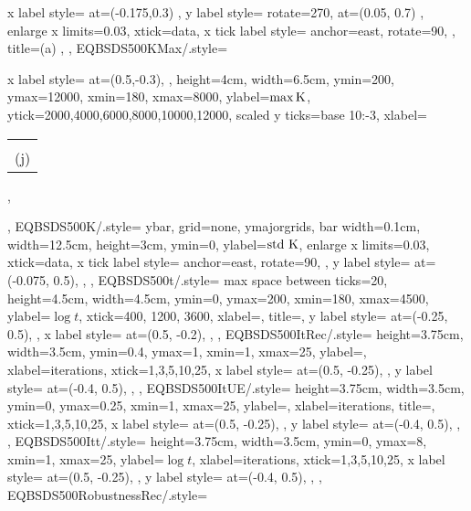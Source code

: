 {{		x label style={
            at={(-0.175,0.3)}
        },
        y label style={
        	rotate=270,
        	at={(0.05, 0.7)}
        },
		enlarge x limits=0.03,
		xtick=data,
		x tick label style={
			anchor=east,
			rotate=90,
		},
		title=(a) \BSDS,
    },
    EQBSDS500KMax/.style={
        x label style={
            at={(0.5,-0.3)},
        },
        height=4cm,
        width=6.5cm,
        ymin=200,
        ymax=12000,
        xmin=180,
        xmax=8000,
        ylabel=$\max \text{K}$,
        ytick={2000,4000,6000,8000,10000,12000},
        scaled y ticks={base 10:-3},
        xlabel=\begin{tabular}{c}\K\\(j)\end{tabular},
    },
    EQBSDS500K/.style={
        ybar,
        grid=none,
        ymajorgrids,
		bar width=0.1cm,
		width=12.5cm,
		height=3cm,
		ymin=0,
		ylabel=$\text{std }\text{K}$,
		enlarge x limits=0.03,
		xtick=data,
		x tick label style={
			anchor=east,
			rotate=90,
		},
		y label style={
			at={(-0.075, 0.5)},
		},
    },
    EQBSDS500t/.style={
        max space between ticks=20,
        height=4.5cm,
        width=4.5cm,
        ymin=0,
        ymax=200,
        xmin=180,
        xmax=4500,
        ylabel=$\log t$,
        xtick={400, 1200, 3600},
        xlabel=\K,
        title=\BSDS,
        y label style={
    		at={(-0.25, 0.5)},
        },
        x label style={
    		at={(0.5, -0.2)},
        },
    },
    EQBSDS500ItRec/.style={
        height=3.75cm,
        width=3.5cm,
        ymin=0.4,
        ymax=1,
        xmin=1,
        xmax=25,
        ylabel=\Rec,
        xlabel=iterations,
        xtick={1,3,5,10,25},
        x label style={
    		at={(0.5, -0.25)},
        },
        y label style={
    		at={(-0.4, 0.5)},
        },
    },
    EQBSDS500ItUE/.style={
        height=3.75cm,
        width=3.5cm,
        ymin=0,
        ymax=0.25,
        xmin=1,
        xmax=25,
        ylabel=\UE,
        xlabel=iterations,
        title=\BSDS,
        xtick={1,3,5,10,25},
        x label style={
    		at={(0.5, -0.25)},
        },
        y label style={
            at={(-0.4, 0.5)},
        },
    },
    EQBSDS500Itt/.style={
        height=3.75cm,
        width=3.5cm,
        ymin=0,
        ymax=8,
        xmin=1,
        xmax=25,
        ylabel=$\log t$,
        xlabel=iterations,
        xtick={1,3,5,10,25},
        x label style={
    		at={(0.5, -0.25)},
        },
        y label style={
            at={(-0.4, 0.5)},
        },
    },
    EQBSDS500RobustnessRec/.style={
}}
